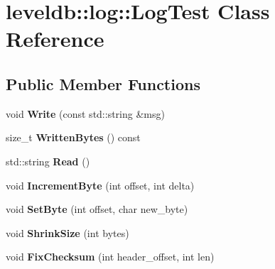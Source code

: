 \hypertarget{classleveldb_1_1log_1_1_log_test}{}\section{leveldb\+::log\+::Log\+Test Class Reference}
\label{classleveldb_1_1log_1_1_log_test}
\subsection*{Public Member Functions}
\begin{DoxyCompactItemize}
\item 
\mbox{\label{classleveldb_1_1log_1_1_log_test_ab8af1c9335e7fbb42e06a6c01de2d0fc}} 
void {\bfseries Write} (const std\+::string \&msg)
\item 
\mbox{\label{classleveldb_1_1log_1_1_log_test_a602824b02f9220d6813768f6f700db47}} 
size\+\_\+t {\bfseries Written\+Bytes} () const
\item 
\mbox{\label{classleveldb_1_1log_1_1_log_test_a2f5deb8b04200600ac0bc7cd3e39bd57}} 
std\+::string {\bfseries Read} ()
\item 
\mbox{\label{classleveldb_1_1log_1_1_log_test_aee52d93f17cf3e23b2ae11bd9a5f5652}} 
void {\bfseries Increment\+Byte} (int offset, int delta)
\item 
\mbox{\label{classleveldb_1_1log_1_1_log_test_a2f3545c3cd495bb60b4322fa045b897c}} 
void {\bfseries Set\+Byte} (int offset, char new\+\_\+byte)
\item 
\mbox{\label{classleveldb_1_1log_1_1_log_test_a2f19ddba7e239badc63920c6fb496823}} 
void {\bfseries Shrink\+Size} (int bytes)
\item 
\mbox{\label{classleveldb_1_1log_1_1_log_test_ac966525faded349590f1a1ae738844cf}} 
void {\bfseries Fix\+Checksum} (int header\+\_\+offset, int len)
\item 
\mbox{\label{classleveldb_1_1log_1_1_log_test_a817eeeba2beef1d81dac83badb9f1049}} 

\end{DoxyCompactItemize}
